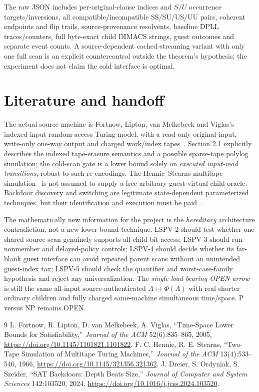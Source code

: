 \documentclass[11pt]{article}
\begin{document}
The raw JSON includes per-original-clause indices and $S/U$ occurrence targets/inversions, all compatible/incompatible SS/SU/US/UU pairs, coherent endpoints and flip trails, source-provenance resolvents, baseline DPLL traces/counters, full byte-exact child DIMACS strings, guest outcomes and separate event counts. A source-dependent cached-streaming variant with only one full scan is an explicit countercontrol outside the theorem's hypothesis; the experiment does not claim the cold interface is optimal.

\section{Literature and handoff}
The actual source machine is Fortnow, Lipton, van Melkebeek and Viglas's indexed-input random-access Turing model, with a read-only original input, write-only one-way output and charged work/index tapes~\cite{FLMV}. Section 2.1 explicitly describes the indexed tape-erasure semantics and a possible sparse-tape polylog simulation; the cold-scan gate is a lower bound solely on \emph{executed input-read transitions}, robust to such re-encodings. The Hennie--Stearns multitape simulation~\cite{HS} is not assumed to supply a free arbitrary-guest virtual-child oracle. Backdoor discovery and switching are legitimate state-dependent parameterized techniques, but their identification and execution must be paid~\cite{DOS}.

The mathematically new information for the project is the \emph{hereditary} architecture contradiction, not a new lower-bound technique. LSPV-2 should test whether one shared source scan genuinely supports all child-bit access; LSPV-3 should run nonmember and delayed-policy controls; LSPV-4 should decide whether its far-blank guest interface can avoid repeated parent scans without an unintended guest-index tax; LSPV-5 should check the quantifier and worst-case-family hypothesis and reject any universalization. The \emph{single load-bearing OPEN arrow} is still the same all-input source-authenticated $A\mapsto\Phi(A)$ with real shorter ordinary children and fully charged same-machine simultaneous time/space. P versus NP remains OPEN.

\begin{thebibliography}{9}
 L. Fortnow, R. Lipton, D. van Melkebeek, A. Viglas, ``Time-Space Lower Bounds for Satisfiability,'' \emph{Journal of the ACM} 52(6):835--865, 2005, \url{https://doi.org/10.1145/1101821.1101822}.
 F. C. Hennie, R. E. Stearns, ``Two-Tape Simulation of Multitape Turing Machines,'' \emph{Journal of the ACM} 13(4):533--546, 1966, \url{https://doi.org/10.1145/321356.321362}.
 J. Dreier, S. Ordyniak, S. Szeider, ``SAT Backdoors: Depth Beats Size,'' \emph{Journal of Computer and System Sciences} 142:103520, 2024, \url{https://doi.org/10.1016/j.jcss.2024.103520}.
\end{thebibliography}
\end{document}
